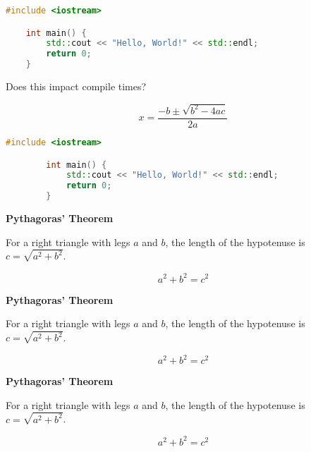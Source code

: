 \begin{lstlisting}[language=C++]
    #include <iostream>

    int main() {
        std::cout << "Hello, World!" << std::endl;
        return 0;
    }
\end{lstlisting}





\lipsum[10]

Does this impact compile times?

\begin{equation*}
    x = \frac{-b \pm \sqrt{b^2 - 4ac}}{2a}
\end{equation*}

\begin{lstlisting}[language=C++]
        #include <iostream>

        int main() {
            std::cout << "Hello, World!" << std::endl;
            return 0;
        }
\end{lstlisting}

\begin{theorem}
    \textbf{Pythagoras' Theorem}

    For a right triangle with legs $a$ and $b$, the length of the hypotenuse is
    $c = \sqrt{a^2 + b^2}$.

    \begin{equation*}
        a^2 + b^2 = c^2
    \end{equation*}
\end{theorem}

\begin{lemma}
    \textbf{Pythagoras' Theorem}

    For a right triangle with legs $a$ and $b$, the length of the hypotenuse is
    $c = \sqrt{a^2 + b^2}$.

    \begin{equation*}
        a^2 + b^2 = c^2
    \end{equation*}
\end{lemma}

\begin{corollary}
    \textbf{Pythagoras' Theorem}

    For a right triangle with legs $a$ and $b$, the length of the hypotenuse is
    $c = \sqrt{a^2 + b^2}$.

    \begin{equation*}
        a^2 + b^2 = c^2
    \end{equation*}
\end{corollary}

